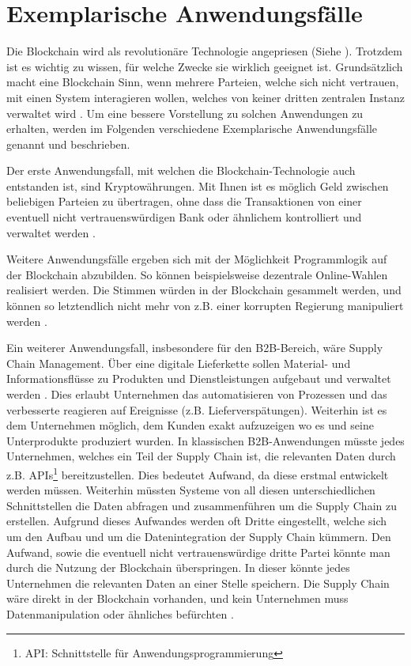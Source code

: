 \section{Exemplarische Anwendungsfälle}
\label{subsec:use-cases}
Die Blockchain wird als revolutionäre Technologie angepriesen (Siehe \cite{TapscottBlockchainRevolutionWieTechnologie2016}). Trotzdem ist es wichtig zu wissen, für welche Zwecke sie wirklich geeignet ist. Grundsätzlich macht eine Blockchain Sinn, wenn mehrere Parteien, welche sich nicht vertrauen, mit einen System interagieren wollen, welches von keiner dritten zentralen Instanz verwaltet wird \cite{WustyouneedBlockchain2017}. Um eine bessere Vorstellung zu solchen Anwendungen zu erhalten, werden im Folgenden verschiedene Exemplarische Anwendungsfälle genannt und beschrieben.

Der erste Anwendungsfall, mit welchen die Blockchain-Technologie auch entstanden ist, sind Kryptowährungen. Mit Ihnen ist es möglich Geld zwischen beliebigen Parteien zu übertragen, ohne dass die Transaktionen von einer eventuell nicht vertrauenswürdigen Bank oder ähnlichem kontrolliert und verwaltet werden \cite{SwanBlockchainblueprintnew2015}.

Weitere Anwendungsfälle ergeben sich mit der Möglichkeit Programmlogik auf der Blockchain abzubilden. So können beispielsweise dezentrale Online-Wahlen realisiert werden. Die Stimmen würden in der Blockchain gesammelt werden, und können so letztendlich nicht mehr von z.B. einer korrupten Regierung manipuliert werden \cite{CastorEthereumVotingScheme2017}. 

Ein weiterer Anwendungsfall, insbesondere für den B2B-Bereich, wäre Supply Chain Management. Über eine digitale Lieferkette sollen Material- und Informationsflüsse zu Produkten und Dienstleistungen aufgebaut und verwaltet werden \cite{KriegerSupplyChainManagement}. Dies erlaubt Unternehmen das automatisieren von Prozessen und das verbesserte reagieren auf Ereignisse (z.B. Lieferverspätungen). Weiterhin ist es dem Unternehmen möglich, dem Kunden exakt aufzuzeigen wo es und seine Unterprodukte produziert wurden. In klassischen B2B-Anwendungen müsste jedes Unternehmen, welches ein Teil der Supply Chain ist, die relevanten Daten durch z.B. APIs\footnote{API: Schnittstelle für Anwendungsprogrammierung\cite{WikipediaProgrammierschnittstelle2017}} bereitzustellen. Dies bedeutet Aufwand, da diese erstmal entwickelt werden müssen. Weiterhin müssten Systeme von all diesen unterschiedlichen Schnittstellen die Daten abfragen und zusammenführen um die Supply Chain zu erstellen. Aufgrund dieses Aufwandes werden oft Dritte eingestellt, welche sich um den Aufbau und um die Datenintegration der Supply Chain kümmern. Den Aufwand, sowie die eventuell nicht vertrauenswürdige dritte Partei könnte man durch die Nutzung der Blockchain überspringen. In dieser könnte jedes Unternehmen die relevanten Daten an einer Stelle speichern. Die Supply Chain wäre direkt in der Blockchain vorhanden, und kein Unternehmen muss Datenmanipulation oder ähnliches befürchten \cite{KorpelaDigitalSupplyChain2017}.

